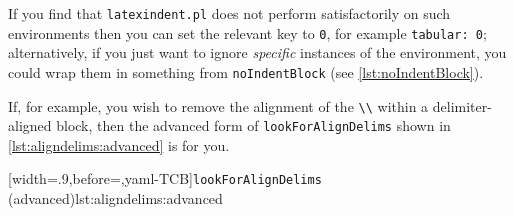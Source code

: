  If you find that \texttt{latexindent.pl} does not perform satisfactorily on such
 environments then you can set the relevant key to \texttt{0}, for example
 \texttt{tabular: 0}; alternatively, if you just want to ignore \emph{specific} instances
 of the environment, you could wrap them in something from \texttt{noIndentBlock} (see
 \vref{lst:noIndentBlock}).

 If, for example, you wish to remove the alignment of the \lstinline!\\! within a
 delimiter-aligned block, then the advanced form of \texttt{lookForAlignDelims} shown in
 \cref{lst:aligndelims:advanced} is for you. 
    

 [width=.9\linewidth,before=\centering,yaml-TCB]{\texttt{lookForAlignDelims} (advanced)}{lst:aligndelims:advanced}


